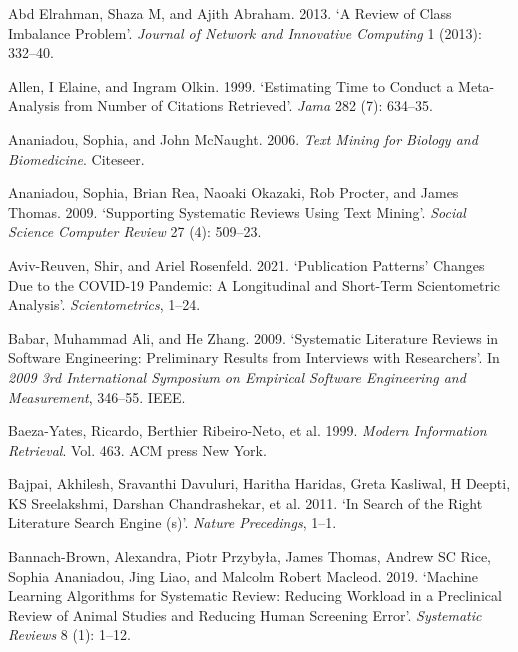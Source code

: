 \documentclass{article}
\newlength{\cslhangindent}
\newlength{\cslentryspacingunit} %
\newenvironment{CSLReferences}[2] %
 {%
  \setlength{\parindent}{0pt}
  \ifodd #1
  \let\oldpar\par
  \def\par{\hangindent=\cslhangindent\oldpar}
  \fi
  \setlength{\parskip}{#2\cslentryspacingunit}
 }%
 {}
\begin{document}
\hypertarget{refs}{}
\begin{CSLReferences}{1}{0}
\leavevmode{}%
Abd Elrahman, Shaza M, and Ajith Abraham. 2013. {`A Review of Class
Imbalance Problem'}. \emph{Journal of Network and Innovative Computing}
1 (2013): 332--40.

\leavevmode{}%
Allen, I Elaine, and Ingram Olkin. 1999. {`Estimating Time to Conduct a
Meta-Analysis from Number of Citations Retrieved'}. \emph{Jama} 282 (7):
634--35.

\leavevmode{}%
Ananiadou, Sophia, and John McNaught. 2006. \emph{Text Mining for
Biology and Biomedicine}. Citeseer.

\leavevmode{}%
Ananiadou, Sophia, Brian Rea, Naoaki Okazaki, Rob Procter, and James
Thomas. 2009. {`Supporting Systematic Reviews Using Text Mining'}.
\emph{Social Science Computer Review} 27 (4): 509--23.

\leavevmode{}%
Aviv-Reuven, Shir, and Ariel Rosenfeld. 2021. {`Publication Patterns'
Changes Due to the COVID-19 Pandemic: A Longitudinal and Short-Term
Scientometric Analysis'}. \emph{Scientometrics}, 1--24.

\leavevmode{}%
Babar, Muhammad Ali, and He Zhang. 2009. {`Systematic Literature Reviews
in Software Engineering: Preliminary Results from Interviews with
Researchers'}. In \emph{2009 3rd International Symposium on Empirical
Software Engineering and Measurement}, 346--55. IEEE.

\leavevmode{}%
Baeza-Yates, Ricardo, Berthier Ribeiro-Neto, et al. 1999. \emph{Modern
Information Retrieval}. Vol. 463. ACM press New York.

\leavevmode{}%
Bajpai, Akhilesh, Sravanthi Davuluri, Haritha Haridas, Greta Kasliwal, H
Deepti, KS Sreelakshmi, Darshan Chandrashekar, et al. 2011. {`In Search
of the Right Literature Search Engine (s)'}. \emph{Nature Precedings},
1--1.

\leavevmode{}%
Bannach-Brown, Alexandra, Piotr Przybyła, James Thomas, Andrew SC Rice,
Sophia Ananiadou, Jing Liao, and Malcolm Robert Macleod. 2019. {`Machine
Learning Algorithms for Systematic Review: Reducing Workload in a
Preclinical Review of Animal Studies and Reducing Human Screening
Error'}. \emph{Systematic Reviews} 8 (1): 1--12.


\end{CSLReferences}
\end{document}
